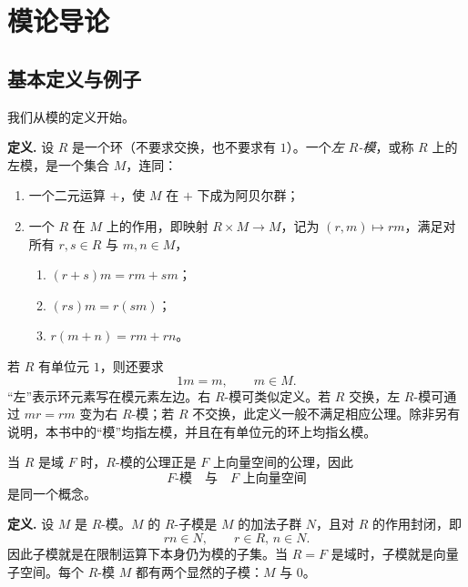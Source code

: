 

\chapter{模论导论}




\section{基本定义与例子}

我们从模的定义开始。


\noindent\textbf{定义.} 设 $R$ 是一个环（不要求交换，也不要求有 $1$）。一个\emph{左 $R$-模}，或称 $R$ 上的左模，是一个集合 $M$，连同：
\begin{enumerate}[label=(\arabic*)]
	\item 一个二元运算 $+$，使 $M$ 在 $+$ 下成为阿贝尔群；
	\item 一个 $R$ 在 $M$ 上的作用，即映射 $R\times M\to M$，记为 $(r,m)\mapsto rm$，满足对所有 $r,s\in R$ 与 $m,n\in M$，
	\begin{enumerate}[label=(\alph*)]
		\item $(r+s)m=rm+sm$；
		\item $(rs)m=r(sm)$；
		\item $r(m+n)=rm+rn$。
	\end{enumerate}
\end{enumerate}
若 $R$ 有单位元 $1$，则还要求
\[
1m=m,\qquad m\in M.
\]
“左”表示环元素写在模元素左边。右 $R$-模可类似定义。若 $R$ 交换，左 $R$-模可通过 $mr=rm$ 变为右 $R$-模；若 $R$ 不交换，此定义一般不满足相应公理。除非另有说明，本书中的“模”均指左模，并且在有单位元的环上均指幺模。

当 $R$ 是域 $F$ 时，$R$-模的公理正是 $F$ 上向量空间的公理，因此
\[
F\text{-模} \quad\text{与}\quad F\text{ 上向量空间}
\]
是同一个概念。


\noindent\textbf{定义.} 设 $M$ 是 $R$-模。$M$ 的 $R$-子模是 $M$ 的加法子群 $N$，且对 $R$ 的作用封闭，即
\[
rn\in N,\qquad r\in R,\, n\in N.
\]
因此子模就是在限制运算下本身仍为模的子集。当 $R=F$ 是域时，子模就是向量子空间。每个 $R$-模 $M$ 都有两个显然的子模：$M$ 与 $0$。

